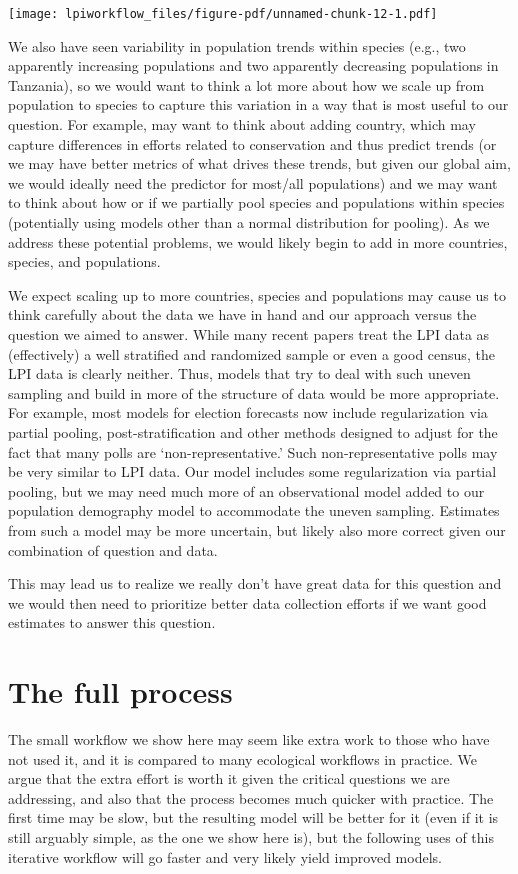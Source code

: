 \documentclass[
  letterpaper,
  DIV=11,
  numbers=noendperiod]{scrartcl}
\begin{document}
\texttt{[image: lpiworkflow\_files/figure-pdf/unnamed-chunk-12-1.pdf]}

We also have seen variability in population trends within species (e.g.,
two apparently increasing populations and two apparently decreasing
populations in Tanzania), so we would want to think a lot more about how
we scale up from population to species to capture this variation in a
way that is most useful to our question. For example, may want to think
about adding country, which may capture differences in efforts related
to conservation and thus predict trends (or we may have better metrics
of what drives these trends, but given our global aim, we would ideally
need the predictor for most/all populations) and we may want to think
about how or if we partially pool species and populations within species
(potentially using models other than a normal distribution for pooling).
As we address these potential problems, we would likely begin to add in
more countries, species, and populations.

We expect scaling up to more countries, species and populations may
cause us to think carefully about the data we have in hand and our
approach versus the question we aimed to answer. While many recent
papers treat the LPI data as (effectively) a well stratified and
randomized sample or even a good census, the LPI data is clearly
neither. Thus, models that try to deal with such uneven sampling and
build in more of the structure of data would be more appropriate. For
example, most models for election forecasts now include regularization
via partial pooling, post-stratification and other methods designed to
adjust for the fact that many polls are `non-representative.' Such
non-representative polls may be very similar to LPI data. Our model
includes some regularization via partial pooling, but we may need much
more of an observational model added to our population demography model
to accommodate the uneven sampling. Estimates from such a model may be
more uncertain, but likely also more correct given our combination of
question and data.

This may lead us to realize we really don't have great data for this
question and we would then need to prioritize better data collection
efforts if we want good estimates to answer this question.

\section{The full process}\label{the-full-process}

The small workflow we show here may seem like extra work to those who
have not used it, and it is compared to many ecological workflows in
practice. We argue that the extra effort is worth it given the critical
questions we are addressing, and also that the process becomes much
quicker with practice. The first time may be slow, but the resulting
model will be better for it (even if it is still arguably simple, as the
one we show here is), but the following uses of this iterative workflow
will go faster and very likely yield improved models.
\end{document}
